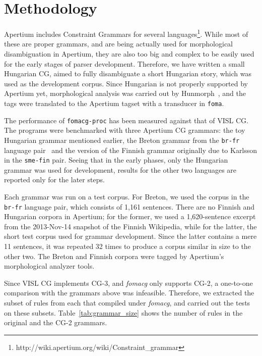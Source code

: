 \documentclass[11pt]{article}
\begin{document}

\section{Methodology}
\label{sec:methodology}

Apertium includes Constraint Grammars for several
languages\footnote{http://wiki.apertium.org/wiki/Constraint\_grammar}. While
most of these are proper grammars, and are being actually used for morphological
disambiguation in Apertium, they are also too big and complex to be easily used
for the early stages of parser development. Therefore, we have written a small
Hungarian CG, aimed to fully disambiguate a short Hungarian story, which was used
as the development corpus. Since Hungarian is not properly supported by Apertium
yet, morphological analysis was carried out by Hunmorph~\cite{Tron:2005}, and
the tags were translated to the Apertium tagset with a transducer in \texttt{foma}.

The performance of \texttt{fomacg-proc} has been measured against that of
VISL CG. The programs were benchmarked with three Apertium CG grammars: the toy
Hungarian grammar mentioned earlier, the Breton grammar from the \texttt{br-fr}
language pair~\cite{Tyers:2010} and the version of the Finnish grammar originally
due to Karlsson in the \texttt{sme-fin} pair. %
Seeing that in the early phases, only the Hungarian grammar was used for
development, results for the other two languages are reported only for the later
steps.

Each grammar was run on a test corpus. For Breton, we used the corpus
in the \texttt{br-fr} language pair, which consists of 1,161 sentences. There
are no Finnish and Hungarian corpora in Apertium; for the former, we used a
1,620-sentence excerpt from the 2013-Nov-14 snapshot of the Finnish Wikipedia,
while for the latter, the short test corpus used for grammar development. Since
the latter contains a mere 11 sentences, it was repeated 32 times to produce
a corpus similar in size to the other two. The Breton and Finnish corpora
were tagged by Apertium's morphological analyzer tools.

Since VISL CG implements CG-3, and \emph{fomacg} only supports CG-2, a one-to-one
comparison with the grammars above was infeasible. Therefore, we extracted the
subset of rules from each that compiled under \emph{fomacg}, and carried out the tests
on these subsets. Table~\ref{tab:grammar_size} shows the number of rules in the
original and the CG-2 grammars.
\end{document}
